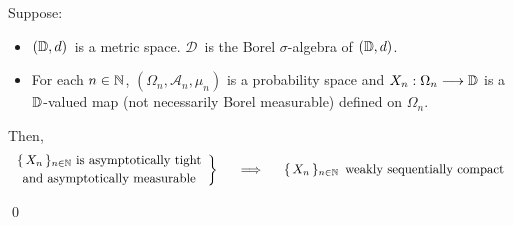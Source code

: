 \vskip 1.0cm
\begin{corollary}
\mbox{}\vskip 0.1cm
\noindent
Suppose:
\begin{itemize}
\item
	$(\mathbb{D},d)$\, is a metric space.
	$\mathcal{D}$\, is the Borel $\sigma$-algebra of $(\mathbb{D},d)$.
\item
	For each $n \in \mathbb{N}$,
	$(\Omega_{n},\mathcal{A}_{n},\mu_{n})$ is a probability space and
	$X_{n} : \Omega_{n} \longrightarrow \mathbb{D}$
	is a $\mathbb{D}$-valued map (not necessarily Borel measurable) defined on $\Omega_{n}$.
\end{itemize}
Then,
\begin{equation*}
	\left.\begin{array}{c}
	\textnormal{$\{\,X_{n}\,\}_{n\in\N}$ is asymptotically tight}
	\\
	\overset{{\color{white}.}}{\textnormal{and asymptotically measurable}}
	\end{array}\right\}
\quad\;\;\Longrightarrow\quad
	\begin{array}{c}
	\textnormal{$\{\,X_{n}\,\}_{n\in\N}$\, weakly sequentially compact}
	\end{array}
\end{equation*}
\end{corollary}
\proof

\qed


\renewcommand{\theenumi}{\roman{enumi}}
\renewcommand{\labelenumi}{\textnormal{(\theenumi)}$\;\;$}

